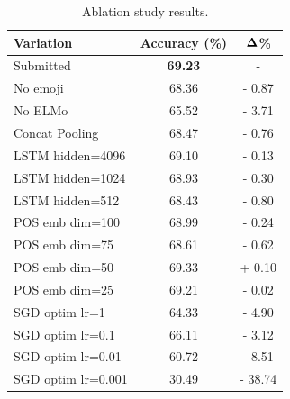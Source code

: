 \documentclass[11pt,a4paper]{article}
\begin{document}
\begin{table}[!h]
    \centering
    \footnotesize

    \begin{tabular}{lcc}

        \textbf{Variation} & \textbf{Accuracy (\%)} & $\bf{\Delta}$\textbf{\%} \\
        \hline
        \hline
        Submitted          & \textbf{69.23}         & -                        \\
        \hline
        No emoji           & 68.36                  & - 0.87                   \\
        \hline
        No ELMo            & 65.52                  & - 3.71                   \\
        \hline
        Concat Pooling     & 68.47                  & - 0.76                   \\
        \hline
        LSTM hidden=4096   & 69.10                  & - 0.13                   \\
        LSTM hidden=1024   & 68.93                  & - 0.30                   \\
        LSTM hidden=512    & 68.43                  & - 0.80                   \\
        \hline
        POS emb dim=100    & 68.99                  & - 0.24                   \\
        POS emb dim=75     & 68.61                  & - 0.62                   \\
        POS emb dim=50     & 69.33                  & + 0.10                   \\
        POS emb dim=25     & 69.21                  & - 0.02                   \\
        \hline
        SGD optim lr=1     & 64.33                  & - 4.90                   \\
        SGD optim lr=0.1   & 66.11                  & - 3.12                   \\
        SGD optim lr=0.01  & 60.72                  & - 8.51                   \\
        SGD optim lr=0.001 & 30.49                  & - 38.74                  \\

    \end{tabular}
    \caption{Ablation study results.}
    \label{table:ablation}

\end{table}
\end{document}
